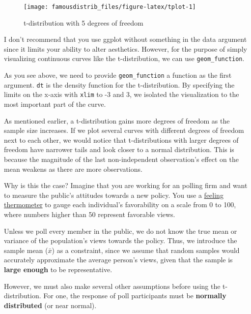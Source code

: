 \documentclass[
]{article}
\begin{document}
\begin{figure}

{\centering \texttt{[image: famousdistrib\_files/figure-latex/tplot-1]} 

}

\caption{t-distribution with 5 degrees of freedom}\label{fig:tplot}
\end{figure}

I don't recommend that you use ggplot without something in the data argument since it limits your ability to alter aesthetics. However, for the purpose of simply visualizing continuous curves like the t-distribution, we can use \texttt{geom\_function}.

As you see above, we need to provide \texttt{geom\_function} a function as the first argument. \texttt{dt} is the density function for the t-distribution. By specifying the limits on the x-axis with \texttt{xlim} to -3 and 3, we isolated the visualization to the most important part of the curve.

As mentioned earlier, a t-distribution gains more degrees of freedom as the sample size increases. If we plot several curves with different degrees of freedom next to each other, we would notice that t-distributions with larger degrees of freedom have narrower tails and look closer to a normal distribution. This is because the magnitude of the last non-independent observation's effect on the mean weakens as there are more observations.

Why is this the case? Imagine that you are working for an polling firm and want to measure the public's attitudes towards a new policy. You use a \href{https://www.google.com/url?sa=t\&rct=j\&q=\&esrc=s\&source=web\&cd=\&cad=rja\&uact=8\&ved=2ahUKEwj2i9-mgujxAhUJ-Z4KHQx3DYUQFnoECAMQAA\&url=https\%3A\%2F\%2Felectionstudies.org\%2F2007anes_gallup_questioncomparisons\%2F\&usg=AOvVaw0Q8BKck04Z4eMBT0hWyUqj}{feeling thermometer} to gauge each individual's favorability on a scale from 0 to 100, where numbers higher than 50 represent favorable views.

Unless we poll every member in the public, we do not know the true mean or variance of the population's views towards the policy. Thus, we introduce the sample mean (\(\bar{x}\)) as a constraint, since we assume that random samples would accurately approximate the average person's views, given that the sample is \textbf{large enough} to be representative.

However, we must also make several other assumptions before using the t-distribution. For one, the response of poll participants must be \textbf{normally distributed} (or near normal).
\end{document}

